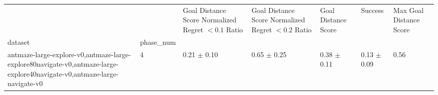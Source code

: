 \begin{tabular}{lllllll}
\toprule
 &  & Goal Distance Score Normalized Regret $< 0.1$ Ratio & Goal Distance Score Normalized Regret $< 0.2$ Ratio & Goal Distance Score & Success & Max Goal Distance Score \\
dataset & phase_num &  &  &  &  &  \\
\midrule
antmaze-large-explore-v0,antmaze-large-explore80navigate-v0,antmaze-large-explore40navigate-v0,antmaze-large-navigate-v0 & 4 & 0.21 $\pm$ 0.10 & 0.65 $\pm$ 0.25 & 0.38 $\pm$ 0.11 & 0.13 $\pm$ 0.09 & 0.56 \\
\cline{1-7}
\bottomrule
\end{tabular}
